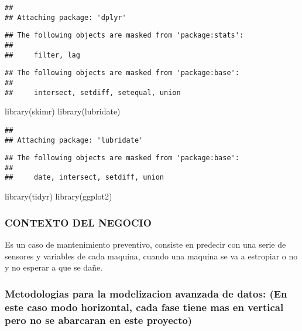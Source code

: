\documentclass[
]{article}
\newenvironment{Shaded}{\begin{snugshade}}{\end{snugshade}}
\newcommand{\FunctionTok}[1]{\textcolor[rgb]{0.00,0.00,0.00}{#1}}
\newcommand{\NormalTok}[1]{#1}
\begin{document}
\begin{verbatim}
## 
## Attaching package: 'dplyr'
\end{verbatim}

\begin{verbatim}
## The following objects are masked from 'package:stats':
## 
##     filter, lag
\end{verbatim}

\begin{verbatim}
## The following objects are masked from 'package:base':
## 
##     intersect, setdiff, setequal, union
\end{verbatim}

\begin{Shaded}
\begin{Highlighting}[]
\FunctionTok{library}\NormalTok{(skimr)}
\FunctionTok{library}\NormalTok{(lubridate)}
\end{Highlighting}
\end{Shaded}

\begin{verbatim}
## 
## Attaching package: 'lubridate'
\end{verbatim}

\begin{verbatim}
## The following objects are masked from 'package:base':
## 
##     date, intersect, setdiff, union
\end{verbatim}

\begin{Shaded}
\begin{Highlighting}[]
\FunctionTok{library}\NormalTok{(tidyr)}
\FunctionTok{library}\NormalTok{(ggplot2)}
\end{Highlighting}
\end{Shaded}

\hypertarget{contexto-del-negocio}{%
\subsubsection{CONTEXTO DEL NEGOCIO}\label{contexto-del-negocio}}

Es un caso de mantenimiento preventivo, consiste en predecir con una
serie de sensores y variables de cada maquina, cuando una maquina se va
a estropiar o no y no esperar a que se dañe.

\hypertarget{metodologias-para-la-modelizacion-avanzada-de-datos-en-este-caso-modo-horizontal-cada-fase-tiene-mas-en-vertical-pero-no-se-abarcaran-en-este-proyecto}{%
\subsubsection{Metodologias para la modelizacion avanzada de datos: (En
este caso modo horizontal, cada fase tiene mas en vertical pero no se
abarcaran en este
proyecto)}\label{metodologias-para-la-modelizacion-avanzada-de-datos-en-este-caso-modo-horizontal-cada-fase-tiene-mas-en-vertical-pero-no-se-abarcaran-en-este-proyecto}}
\end{document}
